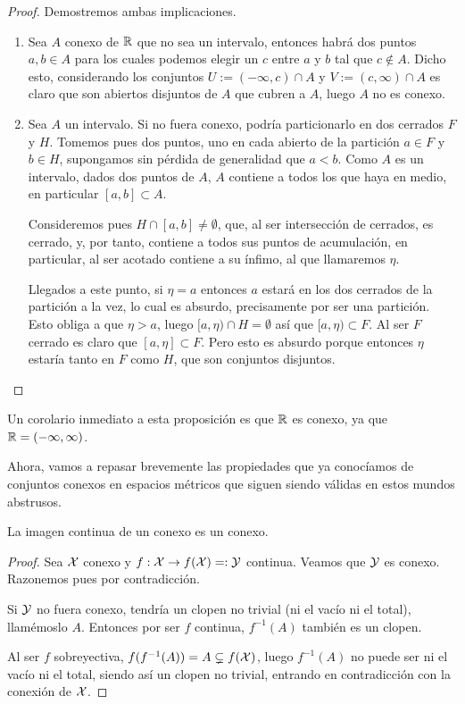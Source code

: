 \begin{proof}
	Demostremos ambas implicaciones.
	\begin{enumerate}
		\item[\bra] Sea $A$ conexo de $\mathbb{R}$ que no sea un intervalo, entonces habrá dos puntos $a,b\in A$ para los cuales podemos elegir un $c$ entre $a$ y $b$ tal que $c\not\in A$. Dicho esto, considerando los conjuntos $U:=(-\infty,c)\cap A$ y $V:=(c,\infty)\cap A$ es claro que son abiertos disjuntos de $A$ que cubren a $A$, luego $A$ no es conexo. 
		\item[\bla] Sea $A$ un intervalo. Si no fuera conexo, podría particionarlo en dos cerrados $F$ y $H$. Tomemos pues dos puntos, uno en cada abierto de la partición $a\in F$ y $b\in H$, supongamos sin pérdida de generalidad que $a<b$. Como $A$ es un intervalo, dados dos puntos de $A$, $A$ contiene a todos los que haya en medio, en particular $[a,b]\subset A$.
		
		Consideremos pues $H\cap[a,b]\not=\emptyset$, que, al ser intersección de cerrados, es cerrado, y, por tanto, contiene a todos sus puntos de acumulación, en particular, al ser acotado contiene a su ínfimo, al que llamaremos $\eta$.
		
		Llegados a este punto, si $\eta=a$ entonces $a$ estará en los dos cerrados de la partición a la vez, lo cual es absurdo, precisamente por ser una partición. Esto obliga a que $\eta > a$, luego $[a,\eta)\cap H=\emptyset$ así que $[a,\eta)\subset F$. Al ser $F$ cerrado es claro que $[a,\eta]\subset F$. Pero esto es absurdo porque entonces $\eta$ estaría tanto en $F$ como $H$, que son conjuntos disjuntos.\qedhere
	\end{enumerate}
\end{proof}
Un corolario inmediato a esta proposición es que $\mathbb{R}$ es conexo, ya que $\mathbb{R}=(-\infty,\infty)$.

Ahora, vamos a repasar brevemente las propiedades que ya conocíamos de conjuntos conexos en espacios métricos que siguen siendo válidas en estos mundos abstrusos.

\begin{prop}
	\label{conex_prop_im_continua}
	La imagen continua de un conexo es un conexo.
\end{prop}
\begin{proof}
	Sea $\mathcal{X}$ conexo y $f:\mathcal{X}\to f(\mathcal{X})=:\mathcal{Y}$ continua. Veamos que $\mathcal{Y}$ es conexo. Razonemos pues por contradicción.
	
	Si $\mathcal{Y}$ no fuera conexo, tendría un clopen no trivial (ni el vacío ni el total), llamémoslo $A$. Entonces por ser $f$ continua, $f^{-1}(A)$ también es un clopen.
	
	Al ser $f$ sobreyectiva, $f(f^{-1}(A))=A\subsetneq f(\mathcal{X})$, luego $f^{-1}(A)$ no puede ser ni el vacío ni el total, siendo así un clopen no trivial, entrando en contradicción con la conexión de $\mathcal{X}$.
\end{proof}

